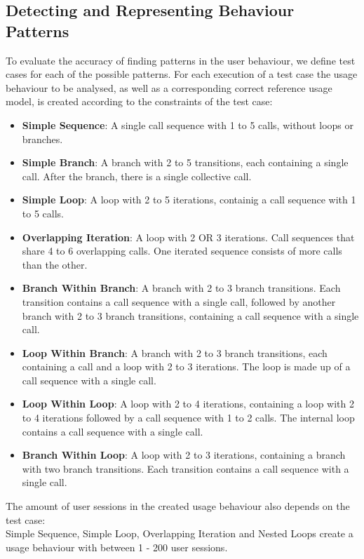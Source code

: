 \documentclass[10pt,a4paper]{article}
\begin{document}
	\subsection{Detecting and Representing Behaviour Patterns}
	To evaluate the accuracy of finding patterns in the user behaviour, we define test cases for each of the possible patterns. For each execution of a test case the usage behaviour to be analysed, as well as a corresponding correct reference usage model, is created according to the constraints of the test case:
	\begin{itemize}
		\item \textbf{Simple Sequence}: A single call sequence with 1 to 5 calls, without loops or branches.
		\item \textbf{Simple Branch}: A branch with 2 to 5 transitions, each containing a single call. After the branch, there is a single collective call.
		\item \textbf{Simple Loop}: A loop with 2 to 5 iterations, containig a call sequence with 1 to 5 calls.
		\item \textbf{Overlapping Iteration}: A loop with 2 OR 3 iterations. Call sequences that share 4 to 6 overlapping calls. One iterated sequence consists of more calls than the other.
		\item \textbf{Branch Within Branch}: A branch with 2 to 3 branch transitions. Each transition contains a call sequence with a single call, followed by another branch with 2 to 3 branch transitions, containing a call sequence with a single call.
		\item \textbf{Loop Within Branch}: A branch with 2 to 3 branch transitions, each containing a call and a loop with 2 to 3 iterations. The loop is made up of a call sequence with a single call.
		\item \textbf{Loop Within Loop}: A loop with 2 to 4 iterations, containing a loop with 2 to 4 iterations followed by a call sequence with 1 to 2 calls. The internal loop contains a call sequence with a single call.
		\item \textbf{Branch Within Loop}: A loop with 2 to 3 iterations, containing a branch with two branch transitions. Each transition contains a call sequence with a single call.
	\end{itemize}
	The amount of user sessions in the created usage behaviour also depends on the test case:\\
	Simple Sequence, Simple Loop, Overlapping Iteration and Nested Loops create a usage behaviour with between 1 - 200 user sessions.\\
\end{document}
